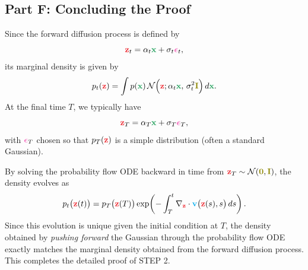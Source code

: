 \documentclass[usenames,dvipsnames]{article}
\newcommand{\myvec}[1]{\mathbf{#1}}
\newcommand{\myvecsym}[1]{\boldsymbol{#1}}
\newcommand{\vx}{\myvec{\textcolor{ForestGreen}{x}}}
\newcommand{\vz}{\myvec{\textcolor{Red}{z}}}
\newcommand{\vv}{\myvec{\textcolor{Cyan}{v}}}
\newcommand{\vzero}{\myvec{\textcolor{olive}{0}}}
\newcommand{\vI}{\myvec{\textcolor{olive}{I}}}
\newcommand{\vepsilon}{\myvecsym{\textcolor{CarnationPink}{\epsilon}}}
\begin{document}
\subsection*{Part F: Concluding the Proof}

Since the forward diffusion process is defined by
\[
\vz_t = \alpha_t \vx + \sigma_t \vepsilon_t,
\]
its marginal density is given by
\[
p_t(\vz) = \int p(\vx) \, \mathcal{N}\Bigl(\vz; \alpha_t \vx,\, \sigma_t^2 \vI\Bigr) \, d\vx.
\]
At the final time \(T\), we typically have
\[
\vz_T = \alpha_T \vx + \sigma_T \vepsilon_T,
\]
with \(\vepsilon_T\) chosen so that \(p_T(\vz)\) is a simple distribution (often a standard Gaussian).

By solving the probability flow ODE backward in time from \(\vz_T \sim \mathcal{N}(\vzero, \vI)\), the density evolves as
\[
p_t\bigl(\vz(t)\bigr) = p_T\bigl(\vz(T)\bigr) \exp\!\left(- \int_{T}^{t} \nabla_{\vz} \cdot \vv\bigl(\vz(s),s\bigr) \, ds\right).
\]
Since this evolution is unique given the initial condition at \(T\), the density obtained by \emph{pushing forward} the Gaussian through the probability flow ODE exactly matches the marginal density obtained from the forward diffusion process.
This completes the detailed proof of STEP 2.
\end{document}
